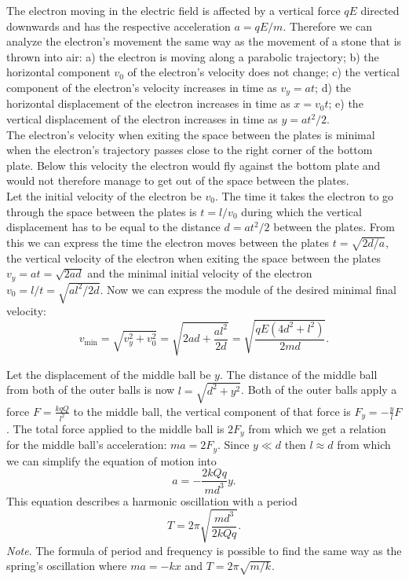 \documentclass[11pt]{article}
\begin{document}
\solueng
The electron moving in the electric field is affected by a vertical force $qE$ directed downwards and has the respective acceleration $a=qE/m$. Therefore we can analyze the electron’s movement the same way as the movement of a stone that is thrown into air: a) the electron is moving along a parabolic trajectory; b) the horizontal component $v_0$ of the electron’s velocity does not change; c) the vertical component of the electron’s velocity increases in time as $v_y=at$; d) the horizontal displacement of the electron increases in time as $x=v_0t$; e) the vertical displacement of the electron increases in time as $y=at^2/2$.\\
The electron’s velocity when exiting the space between the plates is minimal when the electron’s trajectory passes close to the right corner of the bottom plate. Below this velocity the electron would fly against the bottom plate and would not therefore manage to get out of the space between the plates.\\
Let the initial velocity of the electron be $v_0$. The time it takes the electron to go through the space between the plates is $t=l/v_0$ during which the vertical displacement has to be equal to the distance $d=at^2/2$ between the plates. From this we can express the time the electron moves between the plates $t=\sqrt{2d/a}$, the vertical velocity of the electron when exiting the space between the plates $v_y=at=\sqrt{2ad}$ and the minimal initial velocity of the electron $v_0=l/t=\sqrt{al^2/2d}$. Now we can express the module of the desired minimal final velocity:
\[
v_\mathrm{min}=\sqrt{v_y^2+v_0^2}=\sqrt{2ad+\frac{al^2}{2d}}=\sqrt{\frac{qE\left(4d^2+l^2\right)}{2md}}.
\]
\probend
\bigskip


\solueng
Let the displacement of the middle ball be $y$. The distance of the middle ball from both of the outer balls is now $l=\sqrt{d^2+y^2}$. Both of the outer balls apply a force $F=\frac{kqQ}{l^2}$ to the middle ball, the vertical component of that force is $F_y=-\frac{y}{l}F$. The total force applied to the middle ball is $2F_y$ from which we get a relation for the middle ball’s acceleration: $ma=2F_y$. Since $y\ll d$ then $l\approx d$ from which we can simplify the equation of motion into
\[
a=-\frac{2kQq}{md^3}y.
\] 
This equation describes a harmonic oscillation with a period
\[ T = 2\pi \sqrt{\frac{md^3}{2kQq}}.\] 
\emph{Note}. The formula of period and frequency is possible to find the same way as the spring’s oscillation where $ma = -kx$ and $T=2\pi \sqrt{m/k}$.
\probend
\bigskip
\end{document}
